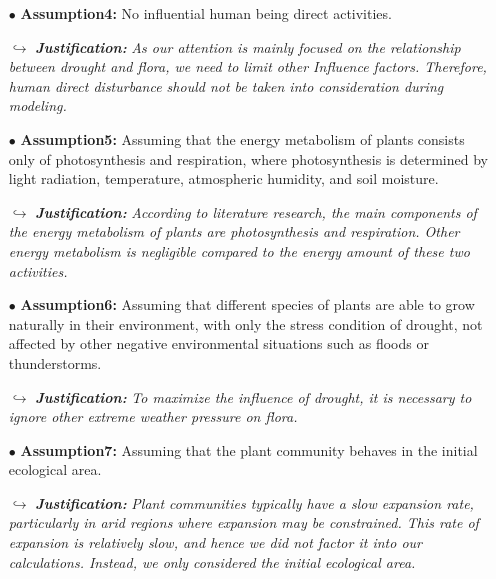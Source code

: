 \documentclass[12pt]{article}  %
\begin{document}
\begin{itemize}
\vspace{-0.2cm}
\item[$\bullet$] \textbf{Assumption4:} No influential human being direct activities.
\vspace{-0.2cm}
\item[$\hookrightarrow $]\textit{\textbf{Justification:}} \textit{As our attention is mainly focused on the relationship between drought and flora, we need to limit other Influence factors. Therefore, human direct disturbance should not be taken into consideration during modeling.}
\vspace{-0.2cm}
\item[$\bullet$] \textbf{Assumption5:} Assuming that the energy metabolism of plants consists only of photosynthesis and respiration, where photosynthesis is determined by light radiation, temperature, atmospheric humidity, and soil moisture.
\vspace{-0.2cm}
\item[$\hookrightarrow $]\textit{\textbf{Justification:}} \textit{According to literature research, the main components of the energy metabolism of plants are photosynthesis and respiration. Other energy metabolism is negligible compared to the energy amount of these two activities.}
\vspace{-0.2cm}
\item[$\bullet$] \textbf{Assumption6:} Assuming that different species of plants are able to grow naturally in their environment, with only the stress condition of drought, not affected by other negative environmental situations such as floods or thunderstorms.
\vspace{-0.2cm}
\item[$\hookrightarrow $]\textit{\textbf{Justification:}} \textit{To maximize the influence of drought, it is necessary to ignore other extreme weather pressure on flora.}
\vspace{-0.2cm}
\item[$\bullet$] \textbf{Assumption7:} Assuming that the plant community behaves in the initial ecological area.
\vspace{-0.2cm}
\item[$\hookrightarrow $]\textit{\textbf{Justification:}} \textit{Plant communities typically have a slow expansion rate, particularly in arid regions where expansion may be constrained. This rate of expansion is relatively slow, and hence we did not factor it into our calculations. Instead, we only considered the initial ecological area.}
\end{itemize}
\end{document}
